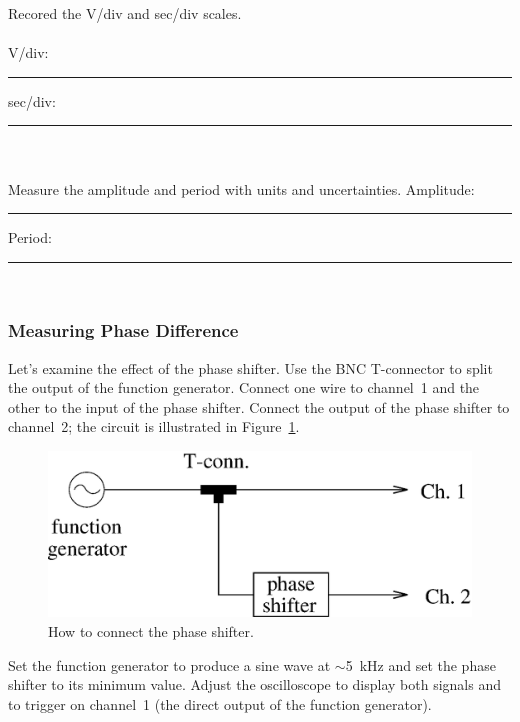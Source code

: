 \noindent Recored the V/div and sec/div scales.\\
\\
V/div:  \rule{3cm}{.1mm} \hspace*{1cm} sec/div: \rule{3cm}{.1mm}\\
\\
Measure the amplitude and period with units and uncertainties.
\vfill
Amplitude:  \rule{3cm}{.1mm} \hspace*{1cm} Period: \rule{3cm}{.1mm}\\
\pagebreak
\subsubsection{Measuring Phase Difference}
\label{sec:scope:measphdiff}

Let's examine the effect of the phase shifter. Use the BNC T-connector to 
split the output of the function generator. Connect one wire to channel~1 and
the other to the input of the phase shifter.  Connect the output of the phase
shifter to channel~2; the circuit is illustrated in 
Figure~\ref{fig:scope:phasemeas}.
\begin{figure}[htb]
\centering \epsfxsize=8cm \includegraphics[scale=0.5]{4_oscilloscope/phasemeas.eps}
\caption{How to connect the phase shifter.}
\label{fig:scope:phasemeas}
\end{figure}
Set the function generator to produce a sine wave at $\sim$5~kHz and set the
phase shifter to its minimum value. Adjust the oscilloscope to display both 
signals and to trigger on channel~1 (the direct output of the function 
generator). \\

